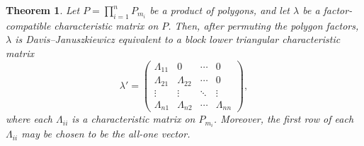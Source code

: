 \documentclass{amsart}
\newtheorem{theorem}{Theorem}[section]
\numberwithin{equation}{section}
\theoremstyle{definition}
\theoremstyle{remark}
\begin{document}
\begin{theorem}\label{thm:blockize}
    Let $P=\prod_{i=1}^n P_{m_i}$ be a product of polygons, and let $\lambda$ be a factor-compatible characteristic matrix on $P$.
    Then, after permuting the polygon factors, $\lambda$ is Davis--Januszkiewicz equivalent to a block lower triangular characteristic matrix
    $$
        \lambda'=
        \begin{pmatrix}
        \Lambda_{11} & 0            & \cdots & 0\\
        \Lambda_{21} & \Lambda_{22} & \cdots & 0\\
        \vdots       & \vdots       & \ddots & \vdots\\
        \Lambda_{n1} & \Lambda_{n2} & \cdots & \Lambda_{nn}
        \end{pmatrix},
    $$
    where each $\Lambda_{ii}$ is a characteristic matrix on $P_{m_i}$.
    Moreover, the first row of each $\Lambda_{ii}$ may be chosen to be the all-one vector.
\end{theorem}
\end{document}
